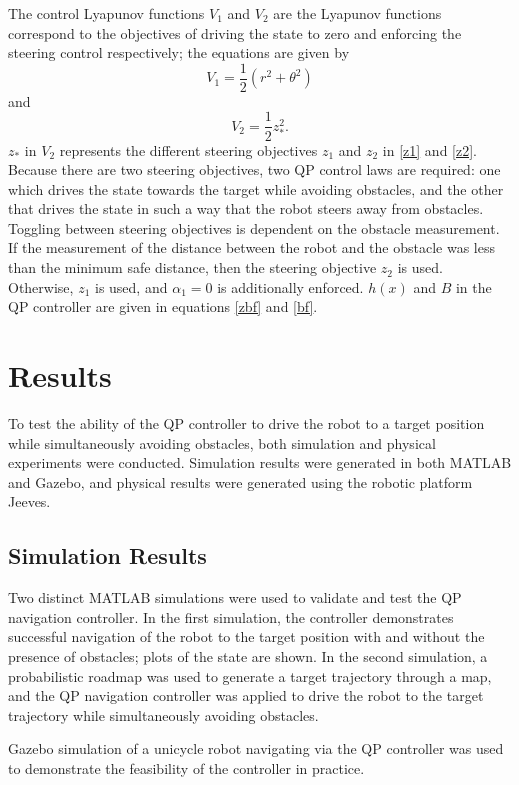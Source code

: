 \documentclass[journal]{IEEEtran}
\begin{document}
The control Lyapunov functions $V_1$ and $V_2$ are the Lyapunov functions correspond to the objectives of driving the state to zero and enforcing the steering control respectively; the equations are given by 
\begin{equation}
V_1=\frac{1}{2}(r^2+\theta^2)
\end{equation} and
\begin{equation}
V_2=\frac{1}{2}z_*^2.
\end{equation}
$z_*$ in $V_2$ represents the different steering objectives $z_1$ and $z_2$ in \eqref{z1} and \eqref{z2}. Because there are two steering objectives, two QP control laws are required: one which drives the state towards the target while avoiding obstacles, and the other that drives the state in such a way that the robot steers away from obstacles. Toggling between steering objectives is dependent on the obstacle measurement. If the measurement of the distance between the robot and the obstacle was less than the minimum safe distance, then the steering objective $z_2$ is used. Otherwise, $z_1$ is used, and $\alpha_1=0$ is additionally enforced. $h(x)$ and $B$ in the QP controller are given in equations \eqref{zbf} and \eqref{bf}. 

\section{Results}
To test the ability of the QP controller to drive the robot to a target position while simultaneously avoiding obstacles, both simulation and physical experiments were conducted. Simulation results were generated in both MATLAB and Gazebo, and physical results were generated using the robotic platform Jeeves. 

\subsection{Simulation Results}
Two distinct MATLAB simulations were used to validate and test the QP navigation controller. In the first simulation, the controller demonstrates successful navigation of the robot to the target position with and without the presence of obstacles; plots of the state are shown. In the second simulation, a probabilistic roadmap was used to generate a target trajectory through a map, and the QP navigation controller was applied to drive the robot to the target trajectory while simultaneously avoiding obstacles. 

Gazebo simulation of a unicycle robot navigating via the QP controller was used to demonstrate the feasibility of the controller in practice.
\end{document}
